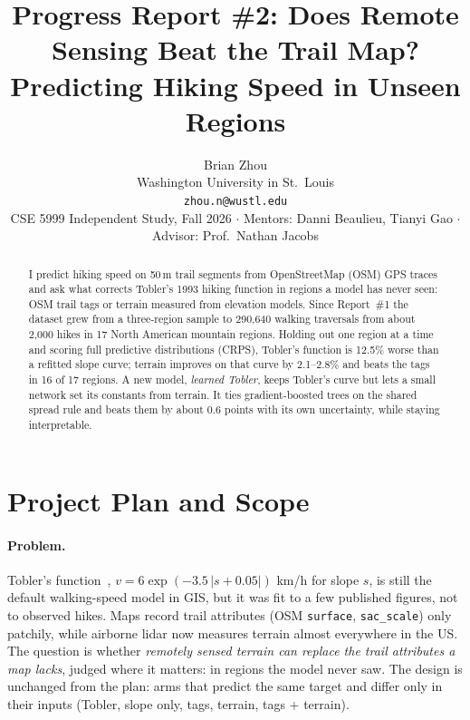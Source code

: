 \documentclass[10pt,twocolumn,letterpaper]{article}
\begin{document}
\title{Progress Report \#2: Does Remote Sensing Beat the Trail Map?\\Predicting Hiking Speed in Unseen Regions}

\author{Brian Zhou\\
Washington University in St.\ Louis\\
{\tt\small zhou.n@wustl.edu}\\
{\small CSE 5999 Independent Study, Fall 2026 \;$\cdot$\; Mentors: Danni Beaulieu, Tianyi Gao \;$\cdot$\; Advisor: Prof.\ Nathan Jacobs}
}
\maketitle

\begin{abstract}
I predict hiking speed on 50\,m trail segments from OpenStreetMap (OSM) GPS traces and ask what corrects Tobler's 1993 hiking function in regions a model has never seen: OSM trail tags or terrain measured from elevation models. Since Report~\#1 the dataset grew from a three-region sample to 290{,}640 walking traversals from about 2{,}000 hikes in 17 North American mountain regions. Holding out one region at a time and scoring full predictive distributions (CRPS), Tobler's function is 12.5\% worse than a refitted slope curve; terrain improves on that curve by 2.1--2.8\% and beats the tags in 16 of 17 regions. A new model, \emph{learned Tobler}, keeps Tobler's curve but lets a small network set its constants from terrain. It ties gradient-boosted trees on the shared spread rule and beats them by about 0.6 points with its own uncertainty, while staying interpretable.
\end{abstract}

\section{Project Plan and Scope}
\label{sec:plan}

\paragraph{Problem.} Tobler's function~\cite{tobler1993}, $v = 6\exp(-3.5\,|s+0.05|)$ km/h for slope $s$, is still the default walking-speed model in GIS, but it was fit to a few published figures, not to observed hikes. Maps record trail attributes (OSM \texttt{surface}, \texttt{sac\_scale}) only patchily, while airborne lidar now measures terrain almost everywhere in the US. The question is whether \emph{remotely sensed terrain can replace the trail attributes a map lacks}, judged where it matters: in regions the model never saw. The design is unchanged from the plan: arms that predict the same target and differ only in their inputs (Tobler, slope only, tags, terrain, tags + terrain).
\end{document}
